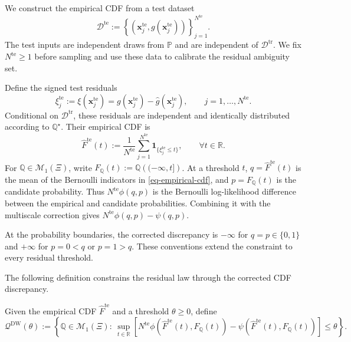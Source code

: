 \documentclass[review,11pt,3p,authoryear,nopreprintline]{elsarticle}
\begin{document}
We construct the empirical CDF from a test dataset
\[
  \mathcal D^{\mathrm{te}}:=\left\{\left(\bm x_j^{\mathrm{te}},g(\bm x_j^{\mathrm{te}})\right)\right\}_{j=1}^{N^{\mathrm{te}}}.
\]
The test inputs are independent draws from $\mathbb P$ and are independent of $\mathcal D^{\mathrm{tr}}$. We fix $N^{\mathrm{te}}\ge1$ before sampling and use these data to calibrate the residual ambiguity set.

Define the signed test residuals
\[
  \xi_j^{\mathrm{te}}:=\xi(\bm x_j^{\mathrm{te}})=g(\bm x_j^{\mathrm{te}})-\hat g(\bm x_j^{\mathrm{te}}),\qquad j=1,\ldots,N^{\mathrm{te}}.
\]
Conditional on $\mathcal D^{\mathrm{tr}}$, these residuals are independent and identically distributed according to $\mathbb Q^\star$. Their empirical CDF is
\begin{equation}
  \widehat F^{\mathrm{te}}(t):=\frac{1}{N^{\mathrm{te}}}\sum_{j=1}^{N^{\mathrm{te}}}\mathbf 1_{\{\xi_j^{\mathrm{te}}\le t\}},\qquad \forall t\in\mathbb R.
  \label{eq-empirical-cdf}
\end{equation}
For $\mathbb Q\in\mathcal M_1(\Xi)$, write $F_{\mathbb Q}(t):=\mathbb Q\left(({-\infty},t]\right)$. At a threshold $t$, $q=\widehat F^{\mathrm{te}}(t)$ is the mean of the Bernoulli indicators in \eqref{eq-empirical-cdf}, and $p=F_{\mathbb Q}(t)$ is the candidate probability. Thus $N^{\mathrm{te}}\phi(q,p)$ is the Bernoulli log-likelihood difference between the empirical and candidate probabilities. Combining it with the multiscale correction gives $N^{\mathrm{te}}\phi(q,p)-\psi(q,p)$.

At the probability boundaries, the corrected discrepancy is $-\infty$ for $q=p\in\{0,1\}$ and $+\infty$ for $p=0<q$ or $p=1>q$. These conventions extend the constraint to every residual threshold.

The following definition constrains the residual law through the corrected CDF discrepancy.

\begin{definition}
  \label{definition-dw-ambiguity-set}
  Given the empirical CDF $\widehat F^{\mathrm{te}}$ and a threshold $\theta\ge0$, define
  \begin{equation} 
    \label{eq-cdf-ambiguity-set}
      \mathcal Q^{\mathrm{DW}}(\theta):=\left\{\mathbb Q\in\mathcal M_1(\Xi):\ 
      \sup_{t\in\mathbb R}\left[ N^{\mathrm{te}}\phi\!\left(\widehat F^{\mathrm{te}}(t),F_{\mathbb Q}(t)\right) 
       {}-\psi\!\left(\widehat F^{\mathrm{te}}(t),F_{\mathbb Q}(t)\right)\right]\le\theta\right\}. 
  \end{equation} 
\end{definition}
\end{document}

